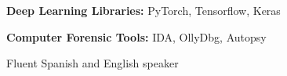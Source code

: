 \documentclass[12pt,a4paper,roman]{moderncv}        %
\makeatletter
\renewcommand*{\bibliographyitemlabel}{\@biblabel{\arabic{enumiv}}}
\makeatother
\begin{document}
\textbf{Deep Learning Libraries:} PyTorch, Tensorflow, Keras
\vspace{2pt}
	
\textbf{Computer Forensic Tools:} IDA, OllyDbg, Autopsy
\vspace{2pt}
	
Fluent Spanish and English speaker
\vspace{2pt}

\nocite{*}



\end{document}
